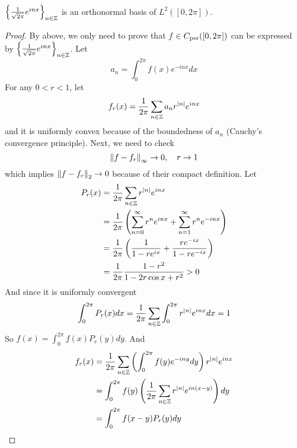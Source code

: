 \begin{enumerate}[label=\arabic*.]
	\begin{thm}
		$\left\{\frac{1}{\sqrt{2\pi}}e^{inx}\right\}_{n \in \mathbb{Z}}$ is an orthonormal basis of $L^2([0,2\pi])$.
	\end{thm}
	\begin{proof}
		By above, we only need to prove that $f \in C_{\operatorname{per}}([0,2\pi])$ can be expressed by $\left\{\frac{1}{\sqrt{2\pi}}e^{inx}\right\}_{n \in \mathbb{Z}}$. Let
		\begin{equation*}
			a_n = \int_0^{2\pi}f(x)e^{-inx}dx
		\end{equation*}
		For any $0 < r < 1$, let
		\begin{equation*}
			f_r(x) = \frac{1}{2\pi} \sum_{n \in \mathbb{Z}} a_nr^{\left\lvert n\right\lvert}e^{inx}
		\end{equation*}
		and it is uniformly convex because of the boundedness of $a_n$ (Cauchy's convergence principle). Next, we need to check
		\begin{equation*}
			\left\lVert f-f_r\right\lVert_\infty \rightarrow 0,\quad r \rightarrow 1
		\end{equation*}
		which implies $\left\lVert f-f_r\right\lVert_2 \rightarrow 0$ because of their compact definition. Let 
		\begin{equation*}
			\begin{aligned}
				P_r(x) &= \frac{1}{2\pi}\sum_{n \in \mathbb{Z}} r^{\left\lvert n\right\lvert}e^{inx} \\
				&=\frac{1}{2\pi}\left(\sum_{n=0}^\infty r^{n}e^{inx} + \sum_{n=1}^\infty r^{n}e^{-inx}\right) \\
				&= \frac{1}{2\pi}\left(\frac{1}{1 - re^{ix}} + \frac{re^{-ix}}{1 - re^{-ix}}\right) \\
				&= \frac{1}{2\pi} \frac{1-r^2}{1-2r\cos x +r^2} > 0
			\end{aligned}
		\end{equation*}
		And since it is uniformly convergent
		\begin{equation*}
			\int_0^{2\pi}P_r(x)dx = \frac{1}{2\pi}\sum_{n \in \mathbb{Z}} \int_0^{2\pi}r^{\left\lvert n\right\lvert}e^{inx}dx = 1
		\end{equation*}
		So $f(x) = \int_0^{2\pi}f(x)P_r(y)dy$. And
		\begin{equation*}
			\begin{aligned}
				f_r(x) &= \frac{1}{2\pi} \sum_{n \in \mathbb{Z}} \left(\int_0^{2\pi}f(y)e^{-iny}dy\right)r^{\left\lvert n\right\lvert}e^{inx} \\
				&= \int_0^{2\pi} f(y) \left(\frac{1}{2\pi} \sum_{n \in \mathbb{Z}} r^{\left\lvert n\right\lvert}e^{in(x-y)}\right)dy \\
				&= \int_0^{2\pi} f(x-y)P_r(y)dy
			\end{aligned}
		\end{equation*}

\end{proof}
\end{enumerate}
